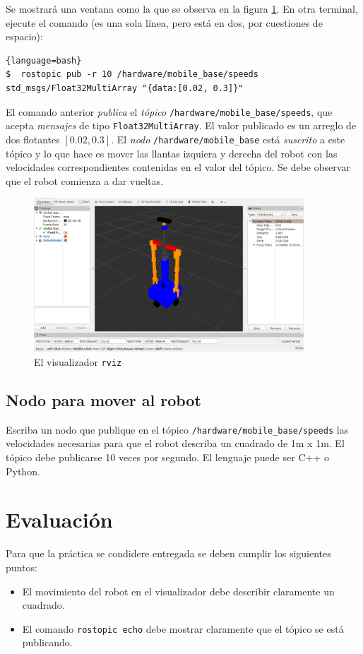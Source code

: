 \documentclass[a4paper,12pt]{article}
\begin{document}
Se mostrará una ventana como la que se observa en la figura \ref{fig:rviz}. En otra terminal, ejecute el comando (es una sola línea, pero está en dos, por cuestiones de espacio):
\begin{lstlisting}{language=bash}
$  rostopic pub -r 10 /hardware/mobile_base/speeds std_msgs/Float32MultiArray "{data:[0.02, 0.3]}"
\end{lstlisting}

El comando anterior \textit{publica} el \textit{tópico} \texttt{/hardware/mobile\_base/speeds}, que acepta \textit{mensajes} de tipo \texttt{Float32MultiArray}. El valor publicado es un arreglo de dos flotantes $[0.02, 0.3]$. El \textit{nodo} \texttt{/hardware/mobile\_base} está \textit{suscrito} a este tópico y lo que hace es mover las llantas izquiera y derecha del robot con las velocidades correspondientes contenidas en el valor del tópico. Se debe observar que el robot comienza a dar vueltas. 

\begin{figure}
\centering
\includegraphics[width=0.9\textwidth]{rviz_initial.png}
\caption{El visualizador \texttt{rviz}}
\label{fig:rviz}
\end{figure}

\subsection{Nodo para mover al robot}
Escriba un nodo que publique en el tópico \texttt{/hardware/mobile\_base/speeds} las velocidades necesarias para que el robot describa un cuadrado de 1m x 1m. El tópico debe publicarse 10 veces por segundo. El lenguaje puede ser C++ o Python.

\section{Evaluación}
Para que la práctica se condidere entregada se deben cumplir los siguientes puntos:
\begin{itemize}
\item El movimiento del robot en el visualizador debe describir claramente un cuadrado.
\item El comando \texttt{rostopic echo} debe mostrar claramente que el tópico se está publicando.
\end{itemize}
\end{document}

